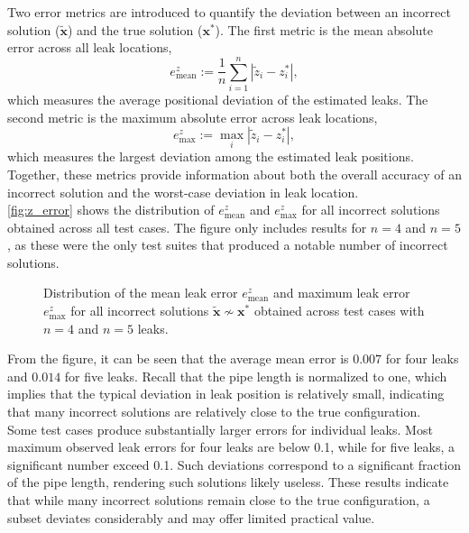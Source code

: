 Two error metrics are introduced to quantify the deviation between an incorrect solution ($\tilde{\mathbf{x}}$) and the true solution ($\mathbf{x}^*$). The first metric is the mean absolute error across all leak locations,
\begin{equation*}
e^{z}_{\text{mean}} := \frac{1}{n}\sum_{i=1}^{n} |\tilde z_i - z_i^*|,
\end{equation*}
which measures the average positional deviation of the estimated leaks. The second metric is the maximum absolute error across leak locations,
\begin{equation*}
e^{z}_{\max} := \max_{i} |\tilde z_i - z_i^*|,
\end{equation*}
which measures the largest deviation among the estimated leak positions. Together, these metrics provide information about both the overall accuracy of an incorrect solution and the worst-case deviation in leak location.\\

\autoref{fig:z_error} shows the distribution of $e^{z}_{\text{mean}}$ and $e^{z}_{\max}$ for all incorrect solutions obtained across all test cases. The figure only includes results for $n=4$ and $n=5$, as these were the only test suites that produced a notable number of incorrect solutions.\\

\begin{figure}[ht]
    \centering
    
    \caption[Distribution of the mean and maximum leak error]{Distribution of the mean leak error $e^{z}_{\text{mean}}$ and maximum leak error $e^{z}_{\max}$ for all incorrect solutions $\tilde{\mathbf{x}} \nsim \mathbf{x}^*$ obtained across test cases with $n=4$ and $n=5$ leaks.}    
    \label{fig:z_error}
\end{figure}

From the figure, it can be seen that the average mean error is $0.007$ for four leaks and $0.014$ for five leaks. Recall that the pipe length is normalized to one, which implies that the typical deviation in leak position is relatively small, indicating that many incorrect solutions are relatively close to the true configuration.\\

Some test cases produce substantially larger errors for individual leaks. Most maximum observed leak errors for four leaks are below 0.1, while for five leaks, a significant number exceed 0.1. Such deviations correspond to a significant fraction of the pipe length, rendering such solutions likely useless. These results indicate that while many incorrect solutions remain close to the true configuration, a subset deviates considerably and may offer limited practical value.\\

